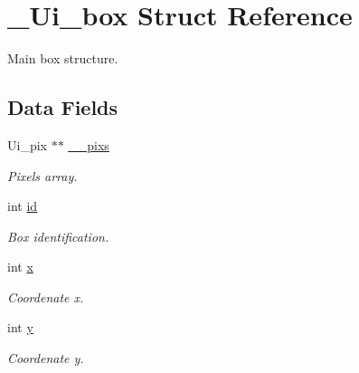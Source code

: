 \hypertarget{struct__Ui__box}{}\section{\+\_\+\+Ui\+\_\+box Struct Reference}
\label{struct__Ui__box}


Main box structure.  


\subsection*{Data Fields}
\begin{DoxyCompactItemize}
\item 
\mbox{\label{struct__Ui__box_a03e07792d6c14766638d58e9e2edb844}} 
Ui\+\_\+pix $\ast$$\ast$ \hyperlink{struct__Ui__box_a03e07792d6c14766638d58e9e2edb844}{\+\_\+\+\_\+pixs}
\begin{DoxyCompactList}\small\item\em Pixels array. \end{DoxyCompactList}\item 
\mbox{\label{struct__Ui__box_a4aa502d3b25a87a1465283d9ccc9fa77}} 
int \hyperlink{struct__Ui__box_a4aa502d3b25a87a1465283d9ccc9fa77}{id}
\begin{DoxyCompactList}\small\item\em Box identification. \end{DoxyCompactList}\item 
\mbox{\label{struct__Ui__box_a6e8c0df6554097fd1d0d0aa84d40ac29}} 
int \hyperlink{struct__Ui__box_a6e8c0df6554097fd1d0d0aa84d40ac29}{x}
\begin{DoxyCompactList}\small\item\em Coordenate x. \end{DoxyCompactList}\item 
\mbox{\label{struct__Ui__box_a7bacb19580dcf6ece3ca60b64f62e459}} 
int \hyperlink{struct__Ui__box_a7bacb19580dcf6ece3ca60b64f62e459}{y}
\begin{DoxyCompactList}\small\item\em Coordenate y. \end{DoxyCompactList}\item 
\mbox{\label{struct__Ui__box_a90f1e8d481ccbf0cc06e3bbb1c12b386}} 
$$
\end{DoxyCompactItemize}
